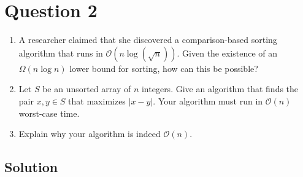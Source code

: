 
\section*{Question 2}

\begin{enumerate}[label=(\alph*)]
\item A researcher claimed that she discovered a comparison-based sorting algorithm that runs in $\mathcal{O}(n\log (\sqrt{n}))$. Given the existence of an $\Omega(n\log n)$ lower bound for sorting, how can this be possible?

\item Let $S$ be an unsorted array of $n$ integers. Give an algorithm that finds the pair $x,y \in S$ that maximizes $|x - y|$. Your algorithm must run in $\mathcal{O}(n)$ worst-case time.

\item Explain why your algorithm is indeed $\mathcal{O}(n)$.
\end{enumerate}

\subsection*{Solution}

